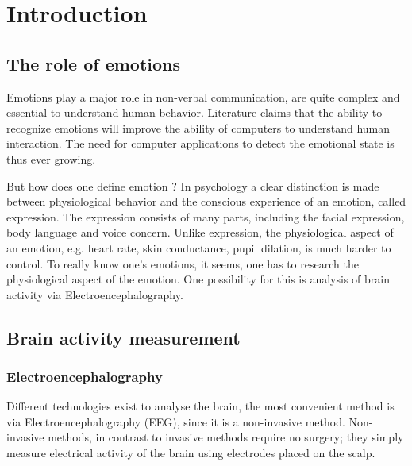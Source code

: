 \chapter{Introduction}


\section{The role of emotions}
Emotions play a major role in non-verbal communication, are quite complex and essential to understand human behavior. Literature claims that the ability to recognize emotions will improve the ability of computers to understand human interaction\cite{CompRecognizeEmotion}. The need for computer applications to detect the emotional state is thus ever growing. 

\npar

But how does one define emotion ? In psychology a clear distinction is made between physiological behavior and the conscious experience of an emotion, called expression\cite{ExtendedPaper}. The expression consists of many parts, including the facial expression, body language and voice concern. Unlike expression, the physiological aspect of an emotion, e.g. heart rate, skin conductance, pupil dilation, is much harder to control. To really know one's emotions, it seems, one has to research the physiological aspect of the emotion. One possibility for this is analysis of brain activity via Electroencephalography\cite{EEGDatasets}.

\section{Brain activity measurement}

\subsection{Electroencephalography}
Different technologies exist to analyse the brain, the most convenient method is via Electroencephalography (EEG), since it is a non-invasive method. Non-invasive methods, in contrast to invasive methods require no surgery; they simply measure electrical activity of the brain using electrodes placed on the scalp. 

